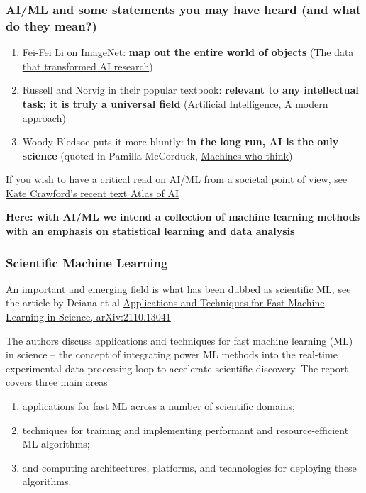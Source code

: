 \documentclass{beamer}
\begin{document}
\begin{frame}
\frametitle{AI/ML and some statements you may have heard (and what do they mean?)}

\begin{enumerate}
\item Fei-Fei Li on ImageNet: \textbf{map out the entire world of objects} (\href{{https://cacm.acm.org/news/219702-the-data-that-transformed-ai-research-and-possibly-the-world/fulltext}}{The data that transformed AI research})

\item Russell and Norvig in their popular textbook: \textbf{relevant to any intellectual task; it is truly a universal field} (\href{{http://aima.cs.berkeley.edu/}}{Artificial Intelligence, A modern approach})

\item Woody Bledsoe puts it more bluntly: \textbf{in the long run, AI is the only science} (quoted in Pamilla McCorduck, \href{{https://www.pamelamccorduck.com/machines-who-think}}{Machines who think})
\end{enumerate}

\noindent
If you wish to have a critical read on AI/ML from a societal point of view, see \href{{https://www.katecrawford.net/}}{Kate Crawford's recent text Atlas of AI}

\textbf{Here: with AI/ML we intend a collection of machine learning methods with an emphasis on statistical learning and data analysis}
\end{frame}

\begin{frame}
\frametitle{Scientific Machine Learning}

An important and emerging field is what has been dubbed as scientific ML, see the article by Deiana et al \href{{https://arxiv.org/abs/2110.13041}}{Applications and Techniques for Fast Machine Learning in Science, arXiv:2110.13041}

\begin{block}{}
The authors discuss applications and techniques for fast machine
learning (ML) in science -- the concept of integrating power ML
methods into the real-time experimental data processing loop to
accelerate scientific discovery. The report covers three main areas

\begin{enumerate}
\item applications for fast ML across a number of scientific domains;

\item techniques for training and implementing performant and resource-efficient ML algorithms;

\item and computing architectures, platforms, and technologies for deploying these algorithms.
\end{enumerate}

\noindent
\end{block}
\end{frame}
\end{document}
